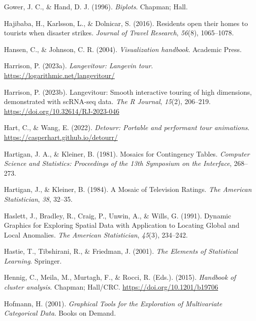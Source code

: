 \documentclass[
  letterpaper,
]{krantz}
\newlength{\cslhangindent}
\newenvironment{CSLReferences}[2] %
 {\begin{list}{}{%
  \setlength{\itemindent}{0pt}
  \setlength{\leftmargin}{0pt}
  \setlength{\parsep}{0pt}
  \ifodd #1
   \setlength{\leftmargin}{\cslhangindent}
   \setlength{\itemindent}{-1\cslhangindent}
  \fi
  \setlength{\itemsep}{#2\baselineskip}}}
 {\end{list}}
\begin{document}
\begin{CSLReferences}{1}{0}
Gower, J. C., \& Hand, D. J. (1996). \emph{Biplots}. Chapman; Hall.

Hajibaba, H., Karlsson, L., \& Dolnicar, S. (2016). Residents open their
homes to tourists when disaster strikes. \emph{Journal of Travel
Research}, \emph{56}(8), 1065--1078.

Hansen, C., \& Johnson, C. R. (2004). \emph{Visualization handbook}.
Academic Press.

Harrison, P. (2023a). \emph{Langevitour: Langevin tour}.
\url{https://logarithmic.net/langevitour/}

Harrison, P. (2023b). Langevitour: Smooth interactive touring of high
dimensions, demonstrated with scRNA-seq data. \emph{The R Journal},
\emph{15}(2), 206--219. \url{https://doi.org/10.32614/RJ-2023-046}

Hart, C., \& Wang, E. (2022). \emph{Detourr: Portable and performant
tour animations}. \url{https://casperhart.github.io/detourr/}

Hartigan, J. A., \& Kleiner, B. (1981). Mosaics for {C}ontingency
{T}ables. \emph{Computer Science and Statistics: Proceedings of the 13th
Symposium on the Interface}, 268--273.

Hartigan, J., \& Kleiner, B. (1984). A {M}osaic of {T}elevision
{R}atings. \emph{The American Statistician}, \emph{38}, 32--35.

Haslett, J., Bradley, R., Craig, P., Unwin, A., \& Wills, G. (1991).
{D}ynamic {G}raphics for {E}xploring {S}patial {D}ata with {A}pplication
to {L}ocating {G}lobal and {L}ocal {A}nomalies. \emph{The American
Statistician}, \emph{45}(3), 234--242.

Hastie, T., Tibshirani, R., \& Friedman, J. (2001). \emph{The {E}lements
of {S}tatistical {L}earning}. Springer.

Hennig, C., Meila, M., Murtagh, F., \& Rocci, R. (Eds.). (2015).
\emph{Handbook of cluster analysis}. Chapman; Hall/{CRC}.
\url{https://doi.org/10.1201/b19706}

Hofmann, H. (2001). \emph{Graphical {T}ools for the {E}xploration of
{M}ultivariate {C}ategorical {D}ata}. Books on Demand.


\end{CSLReferences}
\end{document}

